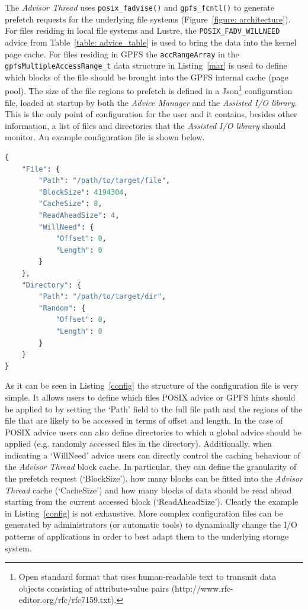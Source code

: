 The \textit{Advisor Thread} uses \texttt{posix\_fadvise()} and \texttt{gpfs\_fcntl()} to generate prefetch requests for the underlying file systems (Figure~\ref{figure: architecture}). For files residing in local file systems and Lustre, the \texttt{POSIX\_FADV\_WILLNEED} advice from Table~\ref{table: advice_table} is used to bring the data into the kernel page cache. For files residing in GPFS the \texttt{accRangeArray} in the \texttt{gpfsMultipleAccessRange\_t} data structure in Listing~\ref{mar} is used to define which blocks of the file should be brought into the GPFS internal cache (page pool). 
The size of the file regions to prefetch is defined in a Json\footnote{Open standard format that uses human-readable text to transmit data objects consisting of attribute-value pairs (http://www.rfc-editor.org/rfc/rfc7159.txt).} configuration file, loaded at startup by both the \textit{Advice Manager} and the \textit{Assisted I/O library}. This is the only point of configuration for the user and it contains, besides other information, a list of files and directories that the \textit{Assisted I/O library} should monitor. An example configuration file is shown below. 

\begin{lstlisting}[language=python, caption=Example of Json Configuration File, label={config}]
{
    "File": {
        "Path": "/path/to/target/file",
        "BlockSize": 4194304,
        "CacheSize": 8,
        "ReadAheadSize": 4,
        "WillNeed": {
            "Offset": 0,
            "Length": 0
        }
    },
    "Directory": {
        "Path": "/path/to/target/dir",
        "Random": {
            "Offset": 0,
            "Length": 0
        }
    }
}
\end{lstlisting}
As it can be seen in Listing~\ref{config} the structure of the configuration file is very simple. It allows users to define which files POSIX advice or GPFS hints should be applied to by setting the `Path' field to the full file path and the regions of the file that are likely to be accessed in terms of offset and length. In the case of POSIX advice users can also define directories to which a global advice should be applied (e.g. randomly accessed files in the directory). Additionally, when indicating a `WillNeed' advice users can directly control the caching behaviour of the \textit{Advisor Thread} block cache. In particular, they can define the granularity of the prefetch request (`BlockSize'), how many blocks can be fitted into the \textit{Advisor Thread} cache (`CacheSize') and how many blocks of data should be read ahead starting from the current accessed block (`ReadAheadSize'). Clearly the example in Listing~\ref{config} is not exhaustive. More complex configuration files can be generated by administrators (or automatic tools) to dynamically change the I/O patterns of applications in order to best adapt them to the underlying storage system.


